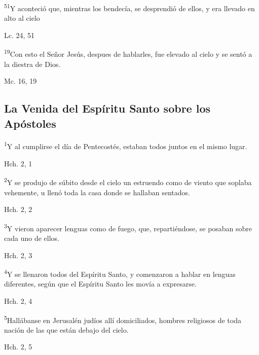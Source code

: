 \documentclass[a4paper,11pt]{article}
\begin{document}
      \textsuperscript{51}Y aconteció que, mientras los bendecía, se desprendió de ellos, y era llevado en alto al cielo
      \begin{flushright}
        Lc. 24, 51
      \end{flushright}

      \textsuperscript{19}Con esto el Señor Jesús, despues de hablarles, fue elevado al cielo y se sentó a la diestra de Dios.
      \begin{flushright}
        Mc. 16, 19
      \end{flushright}
    \subsection*{\hfil La Venida del Espíritu Santo sobre los Apóstoles \hfil}

      \textsuperscript{1}Y al cumplirse el día de Pentecostés, estaban todos juntos en el mismo lugar.
      \begin{flushright}
        Hch. 2, 1
      \end{flushright}

      \textsuperscript{2}Y se produjo de súbito desde el cielo un estruendo como de viento que soplaba vehemente, u llenó toda la casa
      donde se hallaban sentados.
      \begin{flushright}
        Hch. 2, 2
      \end{flushright}

      \textsuperscript{3}Y vieron aparecer lenguas como de fuego, que, repartiéndose, se posaban sobre cada uno de ellos.
      \begin{flushright}
        Hch. 2, 3
      \end{flushright}

      \textsuperscript{4}Y se llenaron todos del Espíritu Santo, y comenzaron a hablar en lenguas diferentes, según que el Espíritu Santo les movía
      a expresarse.
      \begin{flushright}
        Hch. 2, 4
      \end{flushright}

      \textsuperscript{5}Hallábanse en Jerusalén judíos allí domiciliados, hombres religiosos de toda nación de las que están debajo del cielo.
      \begin{flushright}
        Hch. 2, 5
      \end{flushright}
\end{document}
